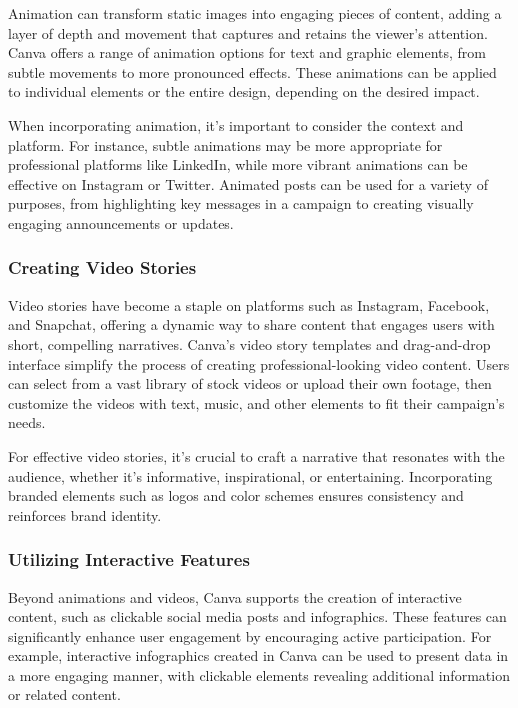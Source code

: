 \documentclass[
]{book}
\begin{document}
Animation can transform static images into engaging pieces of content, adding a layer of depth and movement that captures and retains the viewer's attention. Canva offers a range of animation options for text and graphic elements, from subtle movements to more pronounced effects. These animations can be applied to individual elements or the entire design, depending on the desired impact.

When incorporating animation, it's important to consider the context and platform. For instance, subtle animations may be more appropriate for professional platforms like LinkedIn, while more vibrant animations can be effective on Instagram or Twitter. Animated posts can be used for a variety of purposes, from highlighting key messages in a campaign to creating visually engaging announcements or updates.

\hypertarget{creating-video-stories}{%
\subsubsection*{Creating Video Stories}\label{creating-video-stories}}

Video stories have become a staple on platforms such as Instagram, Facebook, and Snapchat, offering a dynamic way to share content that engages users with short, compelling narratives. Canva's video story templates and drag-and-drop interface simplify the process of creating professional-looking video content. Users can select from a vast library of stock videos or upload their own footage, then customize the videos with text, music, and other elements to fit their campaign's needs.

For effective video stories, it's crucial to craft a narrative that resonates with the audience, whether it's informative, inspirational, or entertaining. Incorporating branded elements such as logos and color schemes ensures consistency and reinforces brand identity.

\hypertarget{utilizing-interactive-features}{%
\subsubsection*{Utilizing Interactive Features}\label{utilizing-interactive-features}}

Beyond animations and videos, Canva supports the creation of interactive content, such as clickable social media posts and infographics. These features can significantly enhance user engagement by encouraging active participation. For example, interactive infographics created in Canva can be used to present data in a more engaging manner, with clickable elements revealing additional information or related content.
\end{document}
